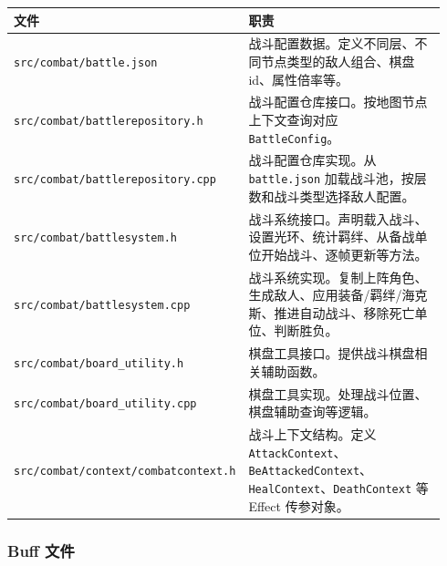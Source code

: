 \documentclass[UTF8,10pt]{ctexart}
\begin{document}
{\small
\begin{longtable}{p{0.34\linewidth}p{0.60\linewidth}}
\toprule
\textbf{文件} & \textbf{职责} \\
\midrule
\texttt{src/\allowbreak{}combat/\allowbreak{}battle.\allowbreak{}json} & 战斗配置数据。定义不同层、不同节点类型的敌人组合、棋盘 id、属性倍率等。 \\
\texttt{src/\allowbreak{}combat/\allowbreak{}battlerepository.\allowbreak{}h} & 战斗配置仓库接口。按地图节点上下文查询对应 \texttt{BattleConfig}。 \\
\texttt{src/\allowbreak{}combat/\allowbreak{}battlerepository.\allowbreak{}cpp} & 战斗配置仓库实现。从 \texttt{battle.\allowbreak{}json} 加载战斗池，按层数和战斗类型选择敌人配置。 \\
\texttt{src/\allowbreak{}combat/\allowbreak{}battlesystem.\allowbreak{}h} & 战斗系统接口。声明载入战斗、设置光环、统计羁绊、从备战单位开始战斗、逐帧更新等方法。 \\
\texttt{src/\allowbreak{}combat/\allowbreak{}battlesystem.\allowbreak{}cpp} & 战斗系统实现。复制上阵角色、生成敌人、应用装备/羁绊/海克斯、推进自动战斗、移除死亡单位、判断胜负。 \\
\texttt{src/\allowbreak{}combat/\allowbreak{}board\_\allowbreak{}utility.\allowbreak{}h} & 棋盘工具接口。提供战斗棋盘相关辅助函数。 \\
\texttt{src/\allowbreak{}combat/\allowbreak{}board\_\allowbreak{}utility.\allowbreak{}cpp} & 棋盘工具实现。处理战斗位置、棋盘辅助查询等逻辑。 \\
\texttt{src/\allowbreak{}combat/\allowbreak{}context/\allowbreak{}combatcontext.\allowbreak{}h} & 战斗上下文结构。定义 \texttt{AttackContext}、\texttt{BeAttackedContext}、\texttt{HealContext}、\texttt{DeathContext} 等 Effect 传参对象。 \\
\bottomrule
\end{longtable}
}

\subsubsection*{Buff 文件}
\end{document}
